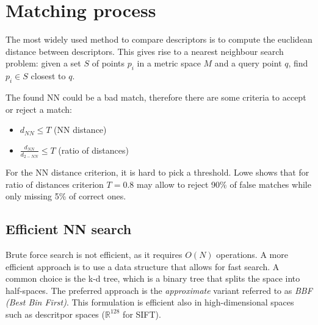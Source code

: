 \documentclass{article}
\newcommand{\R}{\mathbb{R}}
\begin{document}
\section{Matching process}
The most widely used method to compare descriptors is to compute the euclidean distance between descriptors. This gives rise to a nearest neighbour search problem: given a set $S$ of points $p_i$ in a metric space $M$ and a query point $q$, find $p_i\in S$ closest to $q$.

The found NN could be a bad match, therefore there are some criteria to accept or reject a match:
\begin{itemize}
    \item $d_{NN}\leq T$ (NN distance) 
    \item $\displaystyle\frac{d_{NN}}{d_{2-NN}} \leq T$ (ratio of distances)
\end{itemize}
For the NN distance criterion, it is hard to pick a threshold. Lowe shows that for ratio of distances criterion $T=0.8$ may allow to reject 90\% of false matches while only missing 5\% of correct ones.

\subsection{Efficient NN search}
Brute force search is not efficient, as it requires $O(N)$ operations. A more efficient approach is to use a data structure that allows for fast search. A common choice is the k-d tree, which is a binary tree that splits the space into half-spaces. The preferred approach is the \emph{approximate} variant referred to as \emph{BBF (Best Bin First)}. This formulation is efficient also in high-dimensional spaces such as descritpor spaces ($\R^{128}$ for SIFT).
\end{document}

